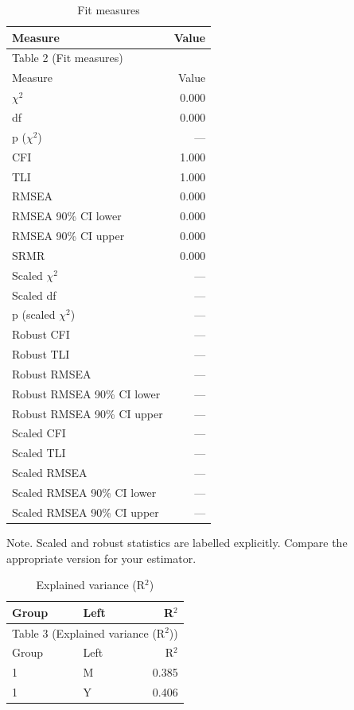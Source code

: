 \documentclass[11pt]{article}
\begin{document}
\small
\begin{longtable}{lr}
\caption{Fit measures}\\
\toprule
Measure & Value \\
\midrule
\endfirsthead
\multicolumn{2}{l}{Table 2 (Fit measures)} \\
\toprule
Measure & Value \\
\midrule
\endhead
$\chi$$^{2}$ & 0.000 \\
df & 0.000 \\
p ($\chi$$^{2}$) & — \\
CFI & 1.000 \\
TLI & 1.000 \\
RMSEA & 0.000 \\
RMSEA 90\% CI lower & 0.000 \\
RMSEA 90\% CI upper & 0.000 \\
SRMR & 0.000 \\
Scaled $\chi$$^{2}$ & — \\
Scaled df & — \\
p (scaled $\chi$$^{2}$) & — \\
Robust CFI & — \\
Robust TLI & — \\
Robust RMSEA & — \\
Robust RMSEA 90\% CI lower & — \\
Robust RMSEA 90\% CI upper & — \\
Scaled CFI & — \\
Scaled TLI & — \\
Scaled RMSEA & — \\
Scaled RMSEA 90\% CI lower & — \\
Scaled RMSEA 90\% CI upper & — \\
\bottomrule
\end{longtable}
\noindent Note. Scaled and robust statistics are labelled explicitly. Compare the appropriate version for your estimator.\par

\small
\begin{longtable}{llr}
\caption{Explained variance (R$^{2}$)}\\
\toprule
Group & Left & R$^{2}$ \\
\midrule
\endfirsthead
\multicolumn{3}{l}{Table 3 (Explained variance (R$^{2}$))} \\
\toprule
Group & Left & R$^{2}$ \\
\midrule
\endhead
1 & M & 0.385 \\
1 & Y & 0.406 \\
\bottomrule
\end{longtable}
\end{document}
